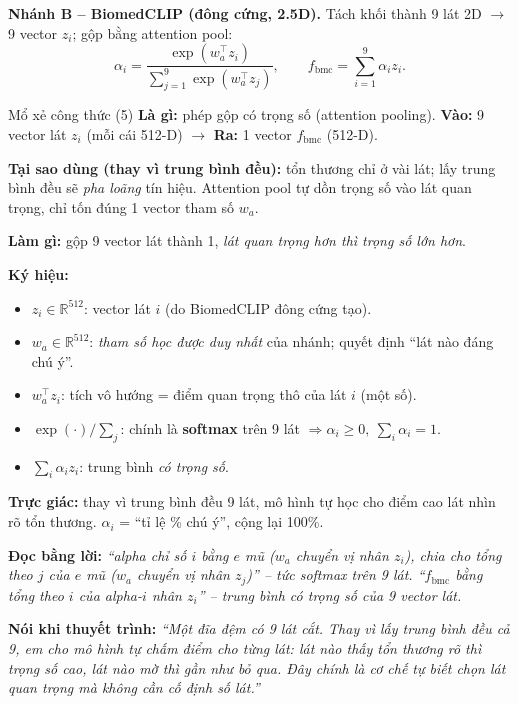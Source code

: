 \documentclass[12pt,a4paper]{article}
\begin{document}
\textbf{Nhánh B -- BiomedCLIP (đông cứng, 2.5D).} Tách khối thành 9 lát 2D $\to$ 9 vector $z_i$; gộp bằng attention pool:
\begin{equation}
\alpha_i=\frac{\exp(w_a^\top z_i)}{\sum_{j=1}^{9}\exp(w_a^\top z_j)},\qquad
f_{\text{bmc}}=\sum_{i=1}^{9}\alpha_i z_i.
\label{eq:pool}
\end{equation}
\begin{ctbox}{Mổ xẻ công thức (5)}
\textbf{Là gì:} phép gộp có trọng số (attention pooling). \quad\textbf{Vào:} 9 vector lát $z_i$ (mỗi cái 512-D) $\to$ \textbf{Ra:} 1 vector $f_{\text{bmc}}$ (512-D).

\textbf{Tại sao dùng (thay vì trung bình đều):} tổn thương chỉ ở vài lát; lấy trung bình đều sẽ \emph{pha loãng} tín hiệu. Attention pool tự dồn trọng số vào lát quan trọng, chỉ tốn đúng 1 vector tham số $w_a$.

\textbf{Làm gì:} gộp 9 vector lát thành 1, \emph{lát quan trọng hơn thì trọng số lớn hơn}.

\textbf{Ký hiệu:}
\begin{itemize}[leftmargin=1.4em,itemsep=1pt]
\item $z_i\in\mathbb{R}^{512}$: vector lát $i$ (do BiomedCLIP đông cứng tạo).
\item $w_a\in\mathbb{R}^{512}$: \emph{tham số học được duy nhất} của nhánh; quyết định ``lát nào đáng chú ý''.
\item $w_a^\top z_i$: tích vô hướng = điểm quan trọng thô của lát $i$ (một số).
\item $\exp(\cdot)/\sum_j$: chính là \textbf{softmax} trên 9 lát $\Rightarrow \alpha_i\ge0,\ \sum_i\alpha_i=1$.
\item $\sum_i\alpha_i z_i$: trung bình \emph{có trọng số}.
\end{itemize}
\textbf{Trực giác:} thay vì trung bình đều 9 lát, mô hình tự học cho điểm cao lát nhìn rõ tổn thương. $\alpha_i$ = ``tỉ lệ \% chú ý'', cộng lại 100\%.

\textbf{Đọc bằng lời:} \emph{``alpha chỉ số $i$ bằng $e$ mũ ($w_a$ chuyển vị nhân $z_i$), chia cho tổng theo $j$ của $e$ mũ ($w_a$ chuyển vị nhân $z_j$)'' -- tức softmax trên 9 lát. ``$f_{\text{bmc}}$ bằng tổng theo $i$ của alpha-$i$ nhân $z_i$'' -- trung bình có trọng số của 9 vector lát.}

\textbf{Nói khi thuyết trình:} \emph{``Một đĩa đệm có 9 lát cắt. Thay vì lấy trung bình đều cả 9, em cho mô hình tự chấm điểm cho từng lát: lát nào thấy tổn thương rõ thì trọng số cao, lát nào mờ thì gần như bỏ qua. Đây chính là cơ chế tự biết chọn lát quan trọng mà không cần cố định số lát.''}
\end{ctbox}
\end{document}

